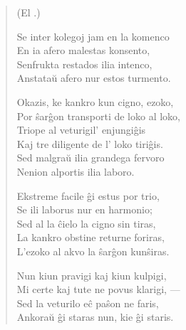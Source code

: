 \begin{verse}
\begin{center}
\footnotesize (El .)
\end{center}
                  Se inter kolegoj jam en la komenco\\
                  En ia afero malestas konsento,\\
                  Senfrukta restados ilia intenco,\\
                  Anstata\u u afero nur estos turmento.

                  Okazis, ke kankro kun cigno, ezoko,\\
                  Por \^sar\^gon transporti de loko al loko,\\
                  Triope al veturigil' enjungi\^gis\\
                  Kaj tre diligente de l' loko tiri\^gis.\\
                  Sed malgra\u u ilia grandega fervoro\\
                  Nenion alportis ilia laboro.

                  Ekstreme facile \^gi estus por trio,\\
                  Se ili laborus nur en harmonio;\\
                  Sed al la \^cielo la cigno sin tiras,\\
                  La kankro obstine returne foriras,\\
                  L'ezoko al akvo la \^sar\^gon kun\^siras.

                  Nun kiun pravigi kaj kiun kulpigi,\\
                  Mi certe kaj tute ne povus klarigi, ---\\
                  Sed la veturilo e\^c pa\^son ne faris,\\
                  Ankora\u u \^gi staras nun, kie \^gi staris.

\end{verse}


\smallrule{}
